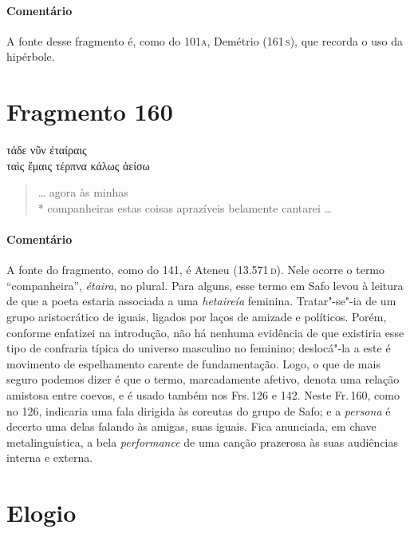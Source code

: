 \medskip

{\paragraph{Comentário} A fonte desse fragmento é, como do 101\textsc{a}, Demétrio (161\,\textsc{s}), que recorda o uso da
hipérbole.}

\pagebreak
\section{Fragmento 160}

\begin{gkverse}
τάδε νῦν ἐταίραις\\
ταὶς ἔμαις \dagger{}τέρπνα\dagger{} κάλως ἀείσω
\end{gkverse}

\begin{verse}
\ldots{} agora às minhas\\*
companheiras estas coisas aprazíveis belamente cantarei \ldots{}
\end{verse}

\medskip

{\paragraph{Comentário} A fonte do fragmento, como do 141, é Ateneu (13.571\,\textsc{d}). Nele ocorre o termo ``companheira'', \textit{étaira}, no plural.
Para alguns, esse termo em Safo levou à leitura de que a poeta estaria associada a uma \textit{hetaireía} feminina. Tratar"-se"-ia de um grupo aristocrático de iguais, ligados por laços de amizade e políticos. Porém, conforme enfatizei na introdução, não há nenhuma evidência de que existiria esse tipo de confraria típica do universo masculino no feminino; deslocá"-la a este é movimento de espelhamento carente de fundamentação. Logo, o que de mais seguro podemos dizer é que o termo, marcadamente afetivo, denota uma relação amistosa entre coevos, e é usado também nos Frs.\,126 e 142. Neste Fr.\,160, como no 126, indicaria uma fala dirigida às coreutas do grupo de Safo; e a \textit{persona} é decerto uma delas falando às amigas, suas iguais. Fica anunciada, em chave metalinguística, a bela \textit{performance}
de uma canção prazerosa às suas audiências interna e externa.}


\pagebreak
\section{Elogio}

